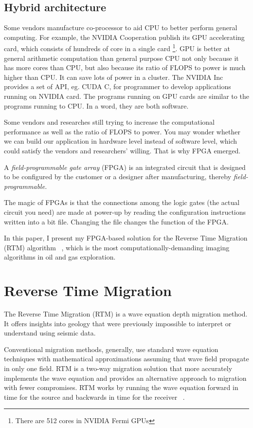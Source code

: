 \subsection{Hybrid architecture}
Some vendors manufacture co-processor to aid CPU to better perform
general computing. For example, the NVIDIA Cooperation publish its
GPU accelerating card, which consists of hundreds of core in a single
card \footnote{There are 512 cores in NVIDIA Fermi GPUs}. GPU is better at general arithmetic
computation than general purpose CPU not only because it has more
cores than CPU, but also because its ratio of FLOPS  to power is much
higher than CPU. It can save lots of power in a cluster. The NVIDIA Inc
provides a set of
API, eg. CUDA C, for programmer to develop applications running on
NVIDIA card. The programs running on GPU cards are similar to the
programs running to CPU. In a word, they are both software.

Some vendors and researches still trying to increase the computational
performance as well as the ratio of FLOPS to power. You may wonder
whether we can build our application in hardware level instead of
software level, which could satisfy the vendors and researchers' willing.
That is why FPGA emerged.

A \emph {field-programmable gate array} (FPGA) is an integrated
circuit that is designed to be configured by the customer or a designer
after manufacturing, thereby \emph {field-programmable.}

The magic of FPGAs is that the connections among the logic gates (the
actual circuit you need) are made at power-up by reading the configuration
instructions written into a bit file. Changing the file changes the
function of the FPGA.

In this paper, I present my FPGA-based solution for the Reverse Time
Migration (RTM) algorithm ~\cite{yoon03}, which is the most computationally-demanding
imaging algorithms in oil and gas exploration.

\section{Reverse Time Migration}
The Reverse Time Migration (RTM) is a wave equation depth migration
method. It offers insights into geology that were previously impossible
to interpret or understand using seismic data.

Conventional migration methods, generally, use standard wave equation
techniques with mathematical approximations assuming that wave field
propagate in only one field. RTM is a two-way migration solution that
more accurately implements the wave equation and provides an alternative
approach to migration with fewer compromises. RTM works by running
the wave equation forward in time for the source and backwards in
time for the receiver ~\cite{shafiq}.


